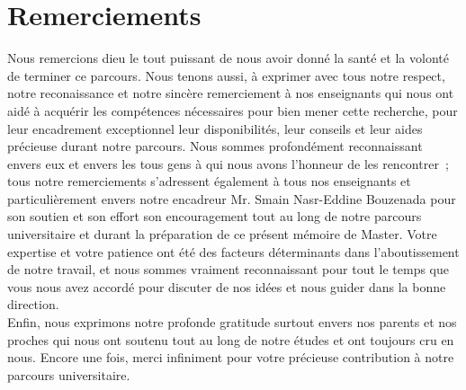 \chapter*{Remerciements}

Nous remercions dieu le tout puissant de nous avoir donné la santé et la volonté de terminer ce parcours. Nous tenons aussi, à exprimer avec tous notre respect, notre reconaissance et notre sincère remerciement à nos enseignants qui nous ont aidé à acquérir les compétences nécessaires pour bien mener cette recherche,  pour leur encadrement exceptionnel leur disponibilités, leur conseils et leur aides précieuse durant notre parcours. Nous sommes profondément reconnaissant envers eux et envers les tous gens à qui nous avons l’honneur de les rencontrer ; tous notre remerciements s’adressent également à tous nos enseignants et particulièrement envers notre encadreur Mr. Smain Nasr-Eddine Bouzenada pour son soutien et son effort son encouragement tout au long de notre parcours universitaire et durant la préparation de ce présent mémoire de Master. Votre expertise et votre patience ont été des facteurs déterminants dans l’aboutissement
de notre travail, et nous sommes vraiment reconnaissant pour tout le temps que vous nous avez accordé pour discuter de nos idées et nous guider dans la bonne direction.
\\
Enfin, nous exprimons notre profonde gratitude surtout envers nos parents et nos proches qui nous ont soutenu tout au long de notre études et ont toujours cru en nous. Encore une fois, merci infiniment pour votre précieuse contribution à notre parcours universitaire.


